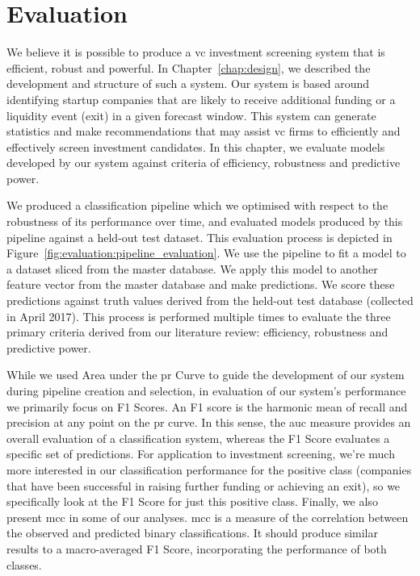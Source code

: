 ﻿\documentclass[../thesis/thesis.tex]{subfiles}
\begin{document}
\chapter{Evaluation}
\label{chap:evaluation}

We believe it is possible to produce a \gls{vc} investment screening system that is efficient, robust and powerful. In Chapter~\ref{chap:design}, we described the development and structure of such a system. Our system is based around identifying startup companies that are likely to receive additional funding or a liquidity event (exit) in a given forecast window. This system can generate statistics and make recommendations that may assist \gls{vc} firms to efficiently and effectively screen investment candidates. In this chapter, we evaluate models developed by our system against criteria of efficiency, robustness and predictive power.

We produced a classification pipeline which we optimised with respect to the robustness of its performance over time, and evaluated models produced by this pipeline against a held-out test dataset. This evaluation process is depicted in Figure~\ref{fig:evaluation:pipeline_evaluation}. We use the pipeline to fit a model to a dataset sliced from the master database. We apply this model to another feature vector from the master database and make predictions. We score these predictions against truth values derived from the held-out test database (collected in April 2017). This process is performed multiple times to evaluate the three primary criteria derived from our literature review: efficiency, robustness and predictive power.

While we used Area under the \gls{pr} Curve to guide the development of our system during pipeline creation and selection, in evaluation of our system's performance we primarily focus on F1 Scores. An F1 score is the harmonic mean of recall and precision at any point on the \gls{pr} curve. In this sense, the \gls{auc} measure provides an overall evaluation of a classification system, whereas the F1 Score evaluates a specific set of predictions. For application to investment screening, we're much more interested in our classification performance for the positive class (companies that have been successful in raising further funding or achieving an exit), so we specifically look at the F1 Score for just this positive class. Finally, we also present \gls{mcc} in some of our analyses. \Gls{mcc} is a measure of the correlation between the observed and predicted binary classifications. It should produce similar results to a macro-averaged F1 Score, incorporating the performance of both classes.
\end{document}
